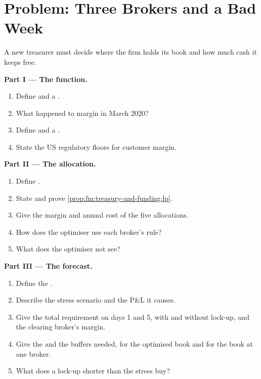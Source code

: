 \section{Problem: Three Brokers and a Bad Week}

\begin{problem}\label{pb:fm:treasury-and-funding:1}
A new treasurer must decide where the firm holds its book and how much cash it keeps free.

\medskip\noindent\textbf{Part I --- The function.}
\begin{enumerate}
\item Define  and a .
\item What happened to margin in March 2020?
\item Define  and a .
\item State the US regulatory floors for customer margin.
\end{enumerate}

\medskip\noindent\textbf{Part II --- The allocation.}
\begin{enumerate}[resume]
\item Define .
\item State and prove \cref{prop:fm:treasury-and-funding:lp}.
\item Give the margin and annual cost of the five allocations.
\item How does the optimiser use each broker's rule?
\item What does the optimiser not see?
\end{enumerate}

\medskip\noindent\textbf{Part III --- The forecast.}
\begin{enumerate}[resume]
\item Define the .
\item Describe the stress scenario and the P\&L it causes.
\item Give the total requirement on days 1 and 5, with and without lock-up, and the clearing broker's margin.
\item Give the  and the buffers needed, for the optimised book and for the book at one broker.
\item What does a lock-up shorter than the stress buy?
\end{enumerate}


\end{problem}
